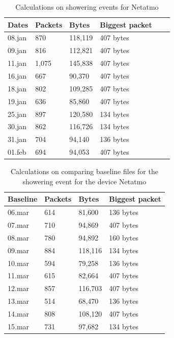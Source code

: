 \begin{table}[H]
    \centering
    \caption{Calculations on showering events for Netatmo}
    \begin{tabular}{|l|l|l|l|l|l|}
    \hline
        \textbf{Dates} & \textbf{Packets} & \textbf{Bytes} & \textbf{Biggest packet} \\ \hline
        08.jan & 870   & 118,119 & 407 bytes\\ \hline
        09.jan & 816   & 112,821 & 407 bytes \\ \hline
        11.jan & 1,075 & 145,838 & 407 bytes\\ \hline
        16.jan & 667   & 90,370  & 407 bytes\\ \hline
        18.jan & 802   & 109,285 & 407 bytes\\ \hline
        19.jan & 636   & 85,860  & 407 bytes \\ \hline
        25.jan & 897   & 120,580 & 134 bytes \\ \hline
        30.jan & 862   & 116,726 & 134 bytes \\ \hline
        31.jan & 704   & 94,140  & 136 bytes \\ \hline
        01.feb & 694   & 94,053  & 407 bytes \\ \hline
    \end{tabular}
    \label{tab:NetatmoShowerCalculations}
\end{table}

\begin{table}[H]
    \centering
    \caption{Calculations on comparing baseline files for the showering event for the device Netatmo}
    \begin{tabular}{|l|l|l|l|}
    \hline
        \textbf{Baseline} & \textbf{Packets} & \textbf{Bytes} & \textbf{Biggest packet} \\ \hline
        06.mar & 614 & 81,600  & 136 bytes\\ \hline
        07.mar & 710 & 94,869  & 407 bytes\\ \hline
        08.mar & 780 & 94,892  & 160 bytes \\ \hline
        09.mar & 884 & 118,116 & 134 bytes \\ \hline
        10.mar & 594 & 79,258  & 136 bytes \\ \hline
        11.mar & 615 & 82,664  & 407 bytes \\ \hline
        12.mar & 857 & 116,703 & 407 bytes \\ \hline
        13.mar & 514 & 68,470  & 136 bytes \\ \hline
        14.mar & 808 & 108,120 & 407 bytes \\ \hline
        15.mar & 731 & 97,682  & 134 bytes \\ \hline
    \end{tabular}
    \label{tab:NetatmoBaselineShowerCalculations}
\end{table}

